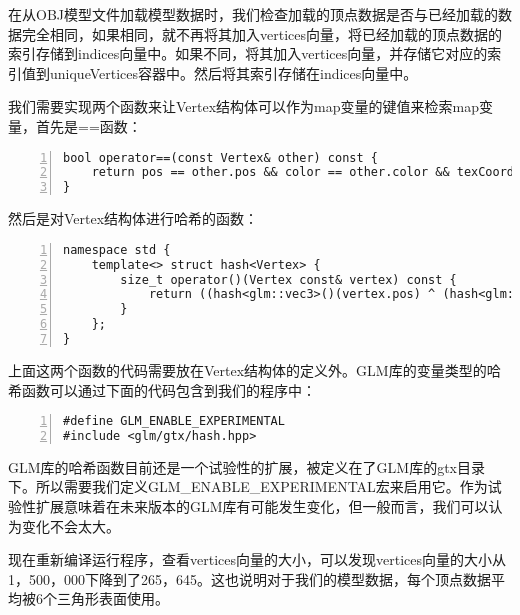 \documentclass{ctexart}
\begin{document}
在从OBJ模型文件加载模型数据时，我们检查加载的顶点数据是否与已经加载的数据完全相同，如果相同，就不再将其加入vertices向量，将已经加载的顶点数据的索引存储到indices向量中。如果不同，将其加入vertices向量，并存储它对应的索引值到uniqueVertices容器中。然后将其索引存储在indices向量中。

我们需要实现两个函数来让Vertex结构体可以作为map变量的键值来检索map变量，首先是==函数：

\begin{lstlisting}[language={[ANSI]C},keywordstyle=\color{blue!70},commentstyle=\color{red!50!green!50!blue!50},frame=shadowbox, rulesepcolor=\color{red!20!green!20!blue!20},basicstyle=\small,numbers=left, numberstyle=\tiny,breaklines=true]
bool operator==(const Vertex& other) const {
	return pos == other.pos && color == other.color && texCoord == other.texCoord;
}
\end{lstlisting}

然后是对Vertex结构体进行哈希的函数：

\begin{lstlisting}[language={[ANSI]C},keywordstyle=\color{blue!70},commentstyle=\color{red!50!green!50!blue!50},frame=shadowbox, rulesepcolor=\color{red!20!green!20!blue!20},basicstyle=\small,numbers=left, numberstyle=\tiny,breaklines=true]
namespace std {
	template<> struct hash<Vertex> {
		size_t operator()(Vertex const& vertex) const {
			return ((hash<glm::vec3>()(vertex.pos) ^ (hash<glm::vec3>()(vertex.color) << 1)) >> 1) ^ (hash<glm::vec2>()(vertex.texCoord) << 1);
		}
	};
}
\end{lstlisting}

上面这两个函数的代码需要放在Vertex结构体的定义外。GLM库的变量类型的哈希函数可以通过下面的代码包含到我们的程序中：

\begin{lstlisting}[language={[ANSI]C},keywordstyle=\color{blue!70},commentstyle=\color{red!50!green!50!blue!50},frame=shadowbox, rulesepcolor=\color{red!20!green!20!blue!20},basicstyle=\small,numbers=left, numberstyle=\tiny,breaklines=true]
#define GLM_ENABLE_EXPERIMENTAL
#include <glm/gtx/hash.hpp>
\end{lstlisting}

GLM库的哈希函数目前还是一个试验性的扩展，被定义在了GLM库的gtx目录下。所以需要我们定义GLM\_ENABLE\_EXPERIMENTAL宏来启用它。作为试验性扩展意味着在未来版本的GLM库有可能发生变化，但一般而言，我们可以认为变化不会太大。

现在重新编译运行程序，查看vertices向量的大小，可以发现vertices向量的大小从1，500，000下降到了265，645。这也说明对于我们的模型数据，每个顶点数据平均被6个三角形表面使用。
\end{document}
